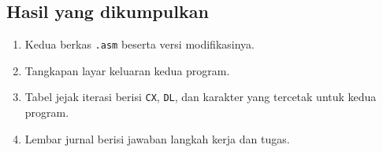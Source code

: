 \subsection{Hasil yang dikumpulkan}

\begin{enumerate}
    \item Kedua berkas \texttt{.asm} beserta versi modifikasinya.
    \item Tangkapan layar keluaran kedua program.
    \item Tabel jejak iterasi berisi \texttt{CX}, \texttt{DL}, dan
          karakter yang tercetak untuk kedua program.
    \item Lembar jurnal berisi jawaban langkah kerja dan tugas.
\end{enumerate}
